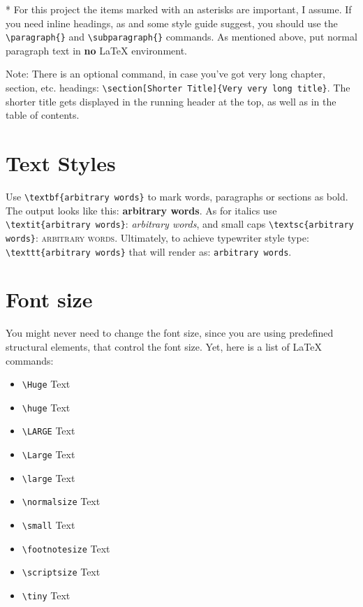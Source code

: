 * For this project the items marked with an asterisks are important, I assume. If you need inline headings, as  and some style guide suggest, you should use the \verb|\paragraph{}| and \verb|\subparagraph{}| commands. As mentioned above, put normal paragraph text in \textbf{no} \LaTeX{} environment.

Note: There is an optional command, in case you’ve got very long chapter, section, etc. headings: \verb|\section[Shorter Title]{Very very long title}|. The shorter title gets displayed in the running header at the top, as well as in the table of contents.

\section{Text Styles}

Use \verb|\textbf{arbitrary words}| to mark words, paragraphs or sections as bold. The output looks like this: \textbf{arbitrary words}. As for italics use \verb|\textit{arbitrary words}|: \textit{arbitrary words}, and small caps \verb|\textsc{arbitrary words}|: \textsc{arbitrary words}. Ultimately, to achieve typewriter style type: \verb|\texttt{arbitrary words}| that will render as: \texttt{arbitrary words}.

\section{Font size}

You might never need to change the font size, since you are using predefined structural elements, that control the font size. Yet, here is a list of \LaTeX{} commands:

\begin{itemize}
	\setlength\itemsep{-0.75em} %
	\Huge
	\item \verb|\Huge| Text
	\huge
	\item \verb|\huge| Text
	\LARGE
	\item \verb|\LARGE| Text
	\Large
	\item \verb|\Large| Text
	\large
	\item \verb|\large| Text
	\normalsize
	\item \verb|\normalsize| Text
	\small
	\item \verb|\small| Text
	\footnotesize
	\item \verb|\footnotesize| Text
	\scriptsize
	\item \verb|\scriptsize| Text
	\tiny
	\item \verb|\tiny| Text
\end{itemize}

